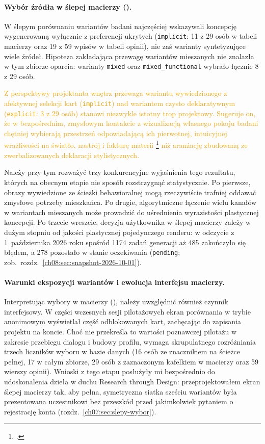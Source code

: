 \paragraph{Wybór źródła w ślepej macierzy ().}
W ślepym porównaniu wariantów badani najczęściej wskazywali koncepcję wygenerowaną wyłącznie z preferencji ukrytych (\texttt{implicit}: 11 z 29 osób w tabeli macierzy oraz 19 z 59 wpisów w tabeli opinii), nie zaś warianty syntetyzujące wiele źródeł. Hipoteza  zakładająca przewagę wariantów mieszanych nie znalazła w tym zbiorze oparcia: warianty \texttt{mixed} oraz \texttt{mixed\_functional} wybrało łącznie 8 z 29 osób.

\textcolor{orange}{Z perspektywy projektanta wnętrz przewaga wariantu wywiedzionego z afektywnej selekcji kart (\texttt{implicit}) nad wariantem czysto deklaratywnym (\texttt{explicit}: 3 z 29 osób) stanowi niezwykle istotny trop projektowy. Sugeruje on, że w bezpośrednim, zmysłowym kontakcie z wizualizacją własnego pokoju badani chętniej wybierają przestrzeń odpowiadającą ich pierwotnej, intuicyjnej wrażliwości na światło, nastrój i fakturę materii \footcite{pallasmaa2012oczy,kahneman2011thinking} niż aranżację zbudowaną ze zwerbalizowanych deklaracji stylistycznych.}

Należy przy tym rozważyć trzy konkurencyjne wyjaśnienia tego rezultatu, których na obecnym etapie nie sposób rozstrzygnąć statystycznie. Po pierwsze, obrazy wywiedzione ze ścieżki behawioralnej mogą rzeczywiście trafniej oddawać zmysłowe potrzeby mieszkańca. Po drugie, algorytmiczne łączenie wielu kanałów w wariantach mieszanych może prowadzić do uśrednienia wyrazistości plastycznej koncepcji. Po trzecie wreszcie, decyzja użytkownika w ślepej macierzy zależy w dużym stopniu od jakości plastycznej pojedynczego renderu: w odczycie z 1~października 2026 roku spośród 1174 zadań generacji aż 485 zakończyło się błędem, a 278 pozostało w stanie oczekiwania (\texttt{pending}; zob.\ rozdz.~\ref{ch08:sec:snapshot-2026-10-01}).

\paragraph{Warunki ekspozycji wariantów i ewolucja interfejsu macierzy.}
Interpretując wybory w macierzy (), należy uwzględnić również czynnik interfejsowy. W części wczesnych sesji pilotażowych ekran porównania w trybie anonimowym wyświetlał część odblokowanych kart, zachęcając do zapisania projektu na koncie. Choć nie przekreśla to wartości poznawczej pilotażu w zakresie przebiegu dialogu i budowy profilu, wymaga skrupulatnego rozróżniania trzech liczników wyboru w bazie danych (16 osób ze znacznikiem na ścieżce pełnej, 17 w całym zbiorze, 29 osób z zaznaczonym kafelkiem w macierzy oraz 59 wierszy opinii). Wnioski z tego etapu posłużyły mi bezpośrednio do udoskonalenia dzieła w duchu Research through Design: przeprojektowałem ekran ślepej macierzy tak, aby pełna, symetryczna siatka sześciu wariantów była prezentowana uczestnikowi bez przeszkód przed jakimkolwiek pytaniem o rejestrację konta (rozdz.~\ref{ch07:sec:slepy-wybor}).

